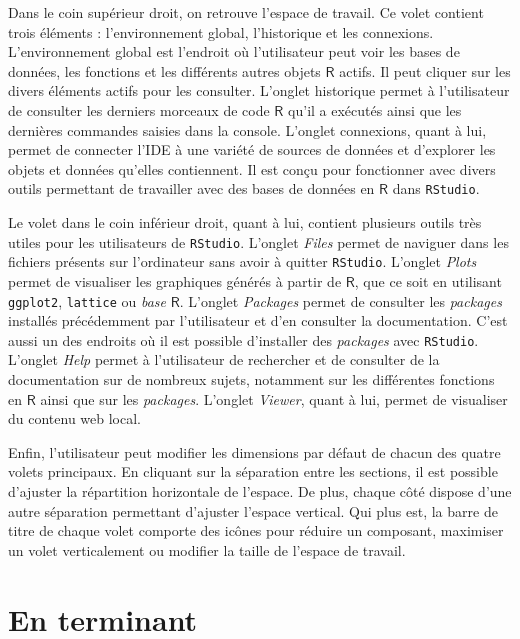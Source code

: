 \documentclass[
  letterpaper,
  DIV=11,
  numbers=noendperiod,
  oneside]{scrreprt}
\begin{document}
Dans le coin supérieur droit, on retrouve l'espace de travail. Ce volet
contient trois éléments : l'environnement global, l'historique et les
connexions. L'environnement global est l'endroit où l'utilisateur peut
voir les bases de données, les fonctions et les différents autres objets
\(\textsf{R}\) actifs. Il peut cliquer sur les divers éléments actifs
pour les consulter. L'onglet historique permet à l'utilisateur de
consulter les derniers morceaux de code \(\textsf{R}\) qu'il a exécutés
ainsi que les dernières commandes saisies dans la console. L'onglet
connexions, quant à lui, permet de connecter l'IDE à une variété de
sources de données et d'explorer les objets et données qu'elles
contiennent. Il est conçu pour fonctionner avec divers outils permettant
de travailler avec des bases de données en \(\textsf{R}\) dans
\texttt{RStudio}.

Le volet dans le coin inférieur droit, quant à lui, contient plusieurs
outils très utiles pour les utilisateurs de \texttt{RStudio}. L'onglet
\emph{Files} permet de naviguer dans les fichiers présents sur
l'ordinateur sans avoir à quitter \texttt{RStudio}. L'onglet
\emph{Plots} permet de visualiser les graphiques générés à partir de
\(\textsf{R}\), que ce soit en utilisant \texttt{ggplot2},
\texttt{lattice} ou \emph{base} \(\textsf{R}\). L'onglet \emph{Packages}
permet de consulter les \emph{packages} installés précédemment par
l'utilisateur et d'en consulter la documentation. C'est aussi un des
endroits où il est possible d'installer des \emph{packages} avec
\texttt{RStudio}. L'onglet \emph{Help} permet à l'utilisateur de
rechercher et de consulter de la documentation sur de nombreux sujets,
notamment sur les différentes fonctions en \(\textsf{R}\) ainsi que sur
les \emph{packages}. L'onglet \emph{Viewer}, quant à lui, permet de
visualiser du contenu web local.

Enfin, l'utilisateur peut modifier les dimensions par défaut de chacun
des quatre volets principaux. En cliquant sur la séparation entre les
sections, il est possible d'ajuster la répartition horizontale de
l'espace. De plus, chaque côté dispose d'une autre séparation permettant
d'ajuster l'espace vertical. Qui plus est, la barre de titre de chaque
volet comporte des icônes pour réduire un composant, maximiser un volet
verticalement ou modifier la taille de l'espace de travail.

\hypertarget{en-terminant-1}{%
\section{En terminant}\label{en-terminant-1}}
\end{document}

